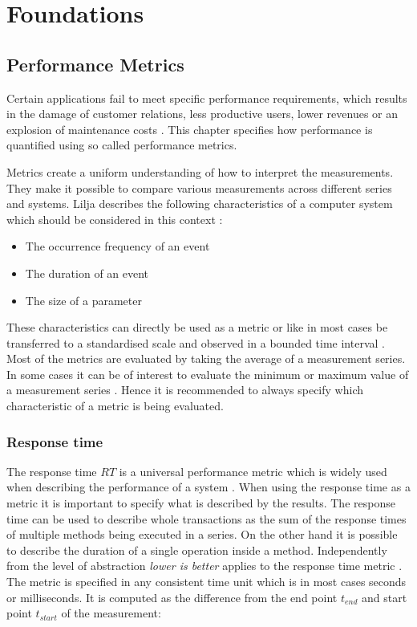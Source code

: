 
\chapter{Foundations}
\label{cha:foundations}

\section{Performance Metrics}
\label{sec:performance-metrics}
Certain applications fail to meet specific performance requirements, which results in the damage of customer relations, less productive users, lower revenues or an explosion of maintenance costs \cite[1]{smith.1998}. This chapter specifies how performance is quantified using so called performance metrics.

Metrics create a uniform understanding of how to interpret the measurements. They make it possible to compare various measurements across different series and systems. Lilja describes the following characteristics of a computer system which should be considered in this context \cite[9]{lilja.2005}:

\begin{itemize}
  \item The occurrence frequency of an event
  \item The duration of an event
  \item The size of a parameter
\end{itemize}

These characteristics can directly be used as a metric or like in most cases be transferred to a standardised scale and observed in a bounded time interval \cite[9]{lilja.2005}. Most of the metrics are evaluated by taking the average of a measurement series. In some cases it can be of interest to evaluate the minimum or maximum value of a measurement series \cite[48]{jain.2008}. Hence it is recommended to always specify which characteristic of a metric is being evaluated.

\subsection*{Response time}
The response time $RT$ is a universal performance metric which is widely used when describing the performance of a system \cite{lilja.2005, cortellessa.2007}. When using the response time as a metric it is important to specify what is described by the results. The response time can be used to describe whole transactions as the sum of the response times of multiple methods being executed in a series. On the other hand it is possible to describe the duration of a single operation inside a method. Independently from the level of abstraction \emph{lower is better} applies to the response time metric \cite[54]{jain.2008}. The metric is specified in any consistent time unit which is in most cases seconds or milliseconds. It is computed as the difference from the end point $t_{end}$ and start point $t_{start}$ of the measurement:

